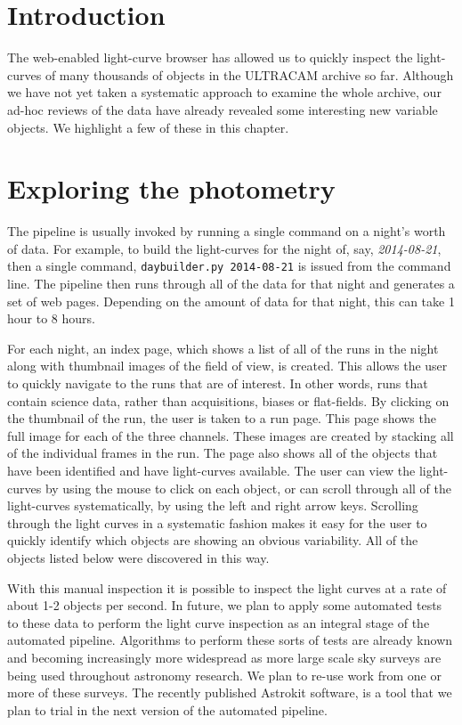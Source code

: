 \section{Introduction}
The web-enabled light-curve browser has allowed us to quickly inspect the light-curves of many thousands of objects in the ULTRACAM archive so far. Although we have not yet taken a systematic approach to examine the whole archive, our ad-hoc reviews of the data have already revealed some interesting new variable objects. We highlight a few of these in this chapter. 

\section{Exploring the photometry}
The pipeline is usually invoked by running a single command on a night's worth of data. For example, to build the light-curves for the night of, say, \emph{2014-08-21}, then a single command, \texttt{daybuilder.py 2014-08-21} is issued from the command line. The pipeline then runs through all of the data for that night and generates a set of web pages. Depending on the amount of data for that night, this can take 1 hour to 8 hours. 

For each night, an index page, which shows a list of all of the runs in the night along with thumbnail images of the field of view, is created. This allows the user to quickly navigate to the runs that are of interest. In other words, runs that contain science data, rather than acquisitions, biases or flat-fields. By clicking on the thumbnail of the run, the user is taken to a run page. This page shows the full image for each of the three channels. These images are created by stacking all of the individual frames in the run. The page also shows all of the objects that have been identified and have light-curves available. The user can view the light-curves by using the mouse to click on each object, or can scroll through all of the light-curves systematically, by using the left and right arrow keys. Scrolling through the light curves in a systematic fashion makes it easy for the user to quickly identify which objects are showing an obvious variability. All of the objects listed below were discovered in this way. 

With this manual inspection it is possible to inspect the light curves at a rate of about 1-2 objects per second. In future, we plan to apply some automated tests to these data to perform the light curve inspection as an integral stage of the automated pipeline. Algorithms to perform these sorts of tests are already known and becoming increasingly more widespread as more large scale sky surveys are being used throughout astronomy research. We plan to re-use work from one or more of these surveys. The recently published Astrokit software, \citep{Astrokit2014} is a tool that we plan to trial in the next version of the automated pipeline. 

